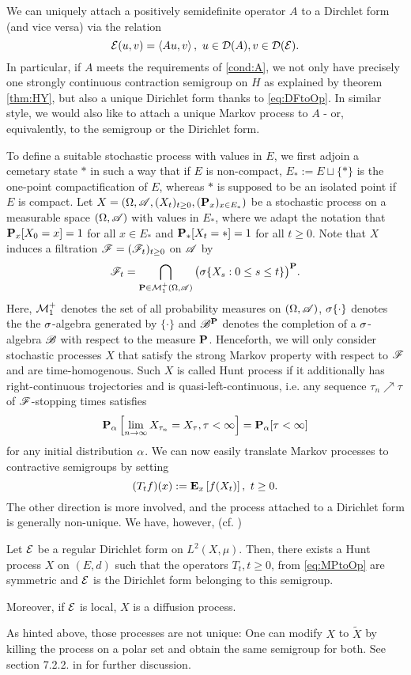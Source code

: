 We can uniquely attach a positively semidefinite operator $A$ to a Dirchlet form (and vice versa) via the relation 
\begin{equation}\label{eq:DFtoOp}
  \cE(u,v)=\left<Au,v\right>,\  u\in\cD(A),v\in\cD(\cE).
\end{equation}
In particular, if $A$ meets the requirements of \ref{cond:A}, we not only have precisely one strongly continuous contraction semigroup on $H$ as explained by theorem \ref{thm:HY}, but also a unique Dirichlet form thanks to \eqref{eq:DFtoOp}. In similar style, we would also like to attach a unique Markov process to $A$ - or, equivalently, to the semigroup or the Dirichlet form. 

To define a suitable stochastic process with values in $E$, we first adjoin a cemetary state $*$ in such a way that if $E$ is non-compact, $E_*:=E\sqcup\{*\}$ is the one-point compactification of $E$, whereas $*$ is supposed to be an isolated point if $E$ is compact. Let $X=\left(\gO,\scA,(X_t)_{t\geq0},(\Prob_x)_{x\in E_*}\right)$ be a stochastic process on a measurable space $(\gO,\scA)$ with values in $E_*$, where we adapt the notation that $\Prob_x[X_0=x]=1$ for all 
$x\in E_*$ and $\Prob_*[X_t=*]=1$ for all $t\geq0$. Note that $X$ induces a filtration $\scF=(\scF_t)_{t\geq0}$ on $\scA$ by 
\[
  \scF_t=\bigcap_{\Prob\in\cM^+_1(\gO,\scA)} \big(\gs\{X_s:0\leq s\leq t\}\big)^\Prob.
\]
Here, $\cM^+_1$ denotes the set of all probability measures on $(\gO,\scA)$, $\gs\{\cdot\}$ denotes the the $\gs$-algebra generated by $\{\cdot\}$ and $\scB^\Prob$ denotes the completion of a $\gs$-algebra $\scB$ with respect to the measure $\Prob$. Henceforth, we will only consider stochastic processes $X$ that satisfy the strong Markov property with respect to $\scF$ and are time-homogenous. Such $X$ is called Hunt process if it additionally has right-continuous trojectories and is quasi-left-continuous, i.e.  any sequence $\tau_n\nearrow\tau$ of $\scF$-stopping times satisfies
\[
  \Prob_\ga\left[\lim_{n\to\infty} X_{\tau_n}=X_\tau,\tau<\infty\right]=\Prob_\ga[\tau<\infty]
\]
for any initial distribution $\ga$. We can now easily translate Markov processes to contractive semigroups by setting
\begin{equation}\label{eq:MPtoOp}
  (T_tf)(x):=\PTEp{f(X_t)}{x},\ t\geq0.
\end{equation}
The other direction is more involved, and the process attached to a Dirichlet form is generally non-unique. We have, however, (cf. \cite[theorems 7.2.1 and 7.2.2]{fukushima2011dirichlet})
\begin{thm}\label{thm:fukushima}
  Let $\cE$ be a regular Dirichlet form on $L^2(X,\mu)$. Then, there exists a Hunt process $X$ on $(E,d)$ such that the operators $T_t, t\geq0$, from \eqref{eq:MPtoOp} are symmetric and $\cE$ is the Dirichlet form belonging to this semigroup.
  
  Moreover, if $\cE$ is local, $X$ is a diffusion process.
\end{thm}
As hinted above, those processes are not unique: One can modify $X$ to $\tilde X$ by killing the process on a polar set and obtain the same semigroup for both. See section 7.2.2. in \cite{fukushima2011dirichlet} for further discussion.


